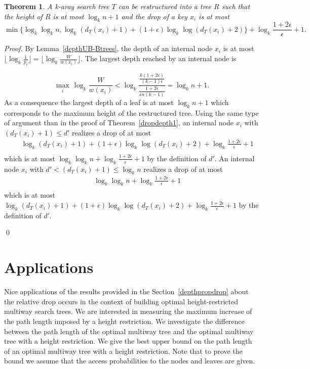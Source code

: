 \documentclass{llncs}\usepackage[english]{babel}
\newtheorem{thm}{Theorem}
\begin{document}
\begin{thm}
A k-aray search tree $T$ can be restructured into a tree $R$ such that the height of $R$ is at most $ \log_k n +1$ and the drop of a key $x_i$ is at most 
\vspace{-0.2cm}
$$\min\{ \log_k \log_k n, \log_k (d_T(x_i)+1)+(1+\epsilon)\log_k \log  (d_T(x_i)+2)  \} + \log_k \frac{1+2\epsilon}{\epsilon}+1.$$
\end{thm}
\begin{proof}
By Lemma~\ref{depthUB-Btrees}, the depth of an internal node $x_i$ is at most $\lfloor \log_{k} \frac{1}{p_i}\rfloor= \lfloor \log_{k} \frac{W}{w(x_i)}\rfloor$. The largest depth reached by an internal node is 

$$\max_i \, \log_{k} \frac{W}{w(x_i)}< \log_{k}\frac{\frac{k(1+2\epsilon)}{(k-1)\epsilon}}{\frac{1+2\epsilon}{\epsilon n (k-1)} }= \log_{k} n +1.$$ 
As a consequence the largest depth of a leaf is at most $\log_{k} n +1$ which corresponds to the maximum height of the restructured tree.
Using the same type of argument than in the proof of Theorem~\ref{dropdepth1}, an internal node $x_i$ with $ (d_T(x_i)+1)\leq d'$ realizes a drop of at most 
\begin{eqnarray*}
&&\log_k (d_T(x_i)+1) + (1+\epsilon)\log_k \log (d_T(x_i)+2) + \log_k \frac{1+2\epsilon}{\epsilon}+1\\
\end{eqnarray*}
which is at most $\log_k \log_k n + \log_k \frac{1+2\epsilon}{\epsilon}+1$ by the definition of $d'$.
An internal node $x_i$ with $d'< (d_T(x_i)+1)\leq \log_k n$ realizes a drop of at most 
\begin{eqnarray*}
&&\log_k \log_k n + \log_k \frac{1+2\epsilon}{\epsilon}+1\\
\end{eqnarray*}
which is at most $\log_k (d_T(x_i)+1)+(1+\epsilon)\log_k \log  (d_T(x_i)+2) + \log_k \frac{1+2\epsilon}{\epsilon}+1$ by the definition of $d'$.

\qed \end{proof}

\section{Applications}
\label{upperheight}
Nice applications of the results provided in the Section~\ref{depthpropdrop} about the relative drop occurs in the context of building optimal height-restricted multiway search trees. We are interested in measuring the maximum increase of the path length imposed by a height restriction. We investigate the difference between the path length of the optimal multiway tree and the optimal multiway tree with a height restriction. We give the best upper bound on the path length of an optimal multiway tree with a height restriction. Note that to prove the bound we assume that the access probabilities to the nodes and leaves are given. 
\end{document}
